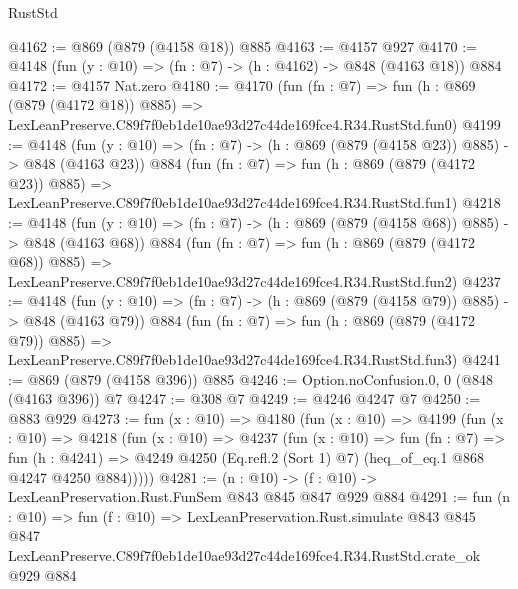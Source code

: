 \begin{lexlean}{RustStd}
\begin{coremodule}
@4162 := @869 (@879 (@4158 @18)) @885
@4163 := @4157 @927
@4170 := @4148 (fun (y : @10) => (fn : @7) -> (h : @4162) -> @848 (@4163 @18)) @884
@4172 := @4157 Nat.zero
@4180 := @4170
    (fun (fn : @7) =>
    fun (h : @869 (@879 (@4172 @18)) @885) =>
    LexLeanPreserve.C89f7f0eb1de10ae93d27c44de169fce4.R34.RustStd.fun0)
@4199 := @4148
    (fun (y : @10) => (fn : @7) -> (h : @869 (@879 (@4158 @23)) @885) -> @848 (@4163 @23))
    @884
    (fun (fn : @7) =>
    fun (h : @869 (@879 (@4172 @23)) @885) =>
    LexLeanPreserve.C89f7f0eb1de10ae93d27c44de169fce4.R34.RustStd.fun1)
@4218 := @4148
    (fun (y : @10) => (fn : @7) -> (h : @869 (@879 (@4158 @68)) @885) -> @848 (@4163 @68))
    @884
    (fun (fn : @7) =>
    fun (h : @869 (@879 (@4172 @68)) @885) =>
    LexLeanPreserve.C89f7f0eb1de10ae93d27c44de169fce4.R34.RustStd.fun2)
@4237 := @4148
    (fun (y : @10) => (fn : @7) -> (h : @869 (@879 (@4158 @79)) @885) -> @848 (@4163 @79))
    @884
    (fun (fn : @7) =>
    fun (h : @869 (@879 (@4172 @79)) @885) =>
    LexLeanPreserve.C89f7f0eb1de10ae93d27c44de169fce4.R34.RustStd.fun3)
@4241 := @869 (@879 (@4158 @396)) @885
@4246 := Option.noConfusion.{0, 0} (@848 (@4163 @396)) @7
@4247 := @308 @7
@4249 := @4246 @4247 @7
@4250 := @883 @929
@4273 := fun (x : @10) =>
  @4180
    (fun (x : @10) =>
    @4199
      (fun (x : @10) =>
      @4218
        (fun (x : @10) =>
        @4237
          (fun (x : @10) =>
          fun (fn : @7) =>
          fun (h : @4241) =>
          @4249 @4250 (Eq.refl.{2} (Sort 1) @7) (heq_of_eq.{1} @868 @4247 @4250 @884)))))
@4281 := (n : @10) -> (f : @10) -> LexLeanPreservation.Rust.FunSem @843 @845 @847 @929 @884
@4291 := fun (n : @10) =>
  fun (f : @10) =>
  LexLeanPreservation.Rust.simulate
    @843
    @845
    @847
    LexLeanPreserve.C89f7f0eb1de10ae93d27c44de169fce4.R34.RustStd.crate_ok
    @929
    @884
\end{coremodule}
\end{lexlean}
